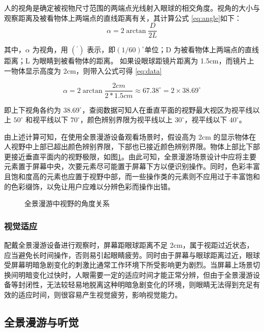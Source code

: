 人的视角是确定被视物尺寸范围的两端点光线射入眼球的相交角度。视角的大小与观察距离及被看物体上两端点的直线距离有关，其计算公式 \ref{eq:angle}如下：
\begin{equation}
\alpha=2\arctan{\frac{D}{2L}}
\label{eq:angle}
\end{equation}

其中，$\alpha$ 为视角，用 $(^{\prime})$ 表示，即$(1/60)^{\circ}$单位；D 为被看物体上两端点的直线距离；L 为眼睛到被看物体的距离。
如果设眼球距镜片距离为 1.5cm，而镜片上一物体显示高度为 2cm，则带入公式可得 \ref{eq:data}

\begin{equation}
\alpha=2\arctan{\frac{2cm}{2*1.5cm}}\approx 67.38 ^{\circ} = 2 \times 38.69^{\circ}
\label{eq:data}
\end{equation}

即上下视角各约为 $38.69^{\circ}$，查阅数据可知人在垂直平面的视野最大视区为视平线以上 $50^{\circ}$ 和视平线以下 $70^{\circ}$，颜色辨别界限为视平线以上 $30^{\circ}$，视平线以下 $40^{\circ}$。

由上述计算可知，在使用全景漫游设备观看场景时，假设高为 2cm 的显示物体在人视野中上部已超出颜色辨别界限，下部也已接近颜色辨别界限。物体上部比下部更接近垂直平面内的视野极限，如图\ref{fig:angle}。由此可知，全景漫游场景设计中应将主要元素置于屏幕中央，次要元素尽可能置于屏幕下方以便识别操作。同时，色彩丰富且饱和度高的元素也应置于视野中部，而一些操作类的元素则不应用过于丰富饱和的色彩缀饰，以免让用户应难以分辨色彩而操作出错。

\begin{figure}[htp]
\centering
{}
\caption{全景漫游中视野的角度关系}
\label{fig:angle}
\end{figure}

\subsubsection{视觉适应}

配戴全景漫游设备进行观察时，屏幕距眼球距离不足 2cm，属于视距过近状态，应当避免长时间操作，否则易引起眼睛疲劳。同时由于屏幕与眼球距离过近，眼球受屏幕明暗急剧变化的刺激比通常工作环境下所受影响更为剧烈。当屏幕上场景切换间明暗变化过快时，人眼需要一定的适应时间才能正常分辨，但由于全景漫游设备等封闭性，无法较轻易地脱离这种明暗急剧变化的环境，则眼睛无法得到充足有效的适应时间，则很容易产生视觉疲劳，影响视觉能力。

\subsection{全景漫游与听觉}

